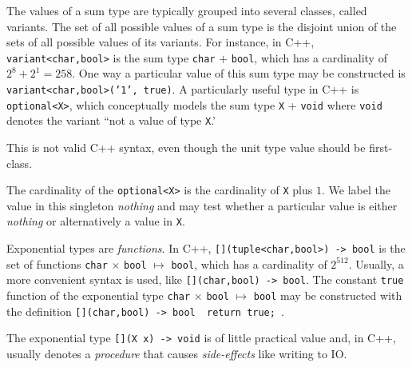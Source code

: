 \documentclass[ ../main.tex]{subfiles}
\begin{document}
The values of a sum type are typically grouped into several classes, called variants.
The set of all possible values of a sum type is the disjoint union of the sets of all possible values of its variants.
For instance, in C++, \texttt{variant<char,bool>}
is the sum type \texttt{char} $+$ \texttt{bool}, which has a cardinality of $2^8 + 2^1 = 258$.
One way a particular value of this sum type may be constructed is \texttt{variant<char,bool>('1', true)}.
A particularly useful type in C++ is \texttt{optional<X>}, which conceptually models the sum type \texttt{X} + \texttt{void} where \texttt{void} denotes the variant ``not a value of type \texttt{X}.'
\begin{remark}
This is not valid C++ syntax, even though the unit type value should be first-class.
\end{remark}
The cardinality of the \texttt{optional<X>} is the cardinality of \texttt{X} plus $1$.
We label the value in this singleton \emph{nothing} and may test whether a particular value is either \emph{nothing} or alternatively a value in \texttt{X}.

Exponential types are \emph{functions}.
In C++, \texttt{[](tuple<char,bool>) -> bool} is the set of functions \texttt{char} $\times$ \texttt{bool} $\mapsto$ \texttt{bool}, which has a cardinality of $2^{512}$.
Usually, a more convenient syntax is used, like \texttt{[](char,bool) -> bool}.
The constant \texttt{true} function of the exponential type \texttt{char} $\times$ \texttt{bool} $\mapsto$ \texttt{bool} may be constructed with the definition \texttt{[](char,bool) -> bool { return true; }}.
\begin{remark}
The exponential type \texttt{[](X x) -> void} is of little practical value and, in C++, usually denotes a \emph{procedure} that causes \emph{side-effects} like writing to IO.
\end{remark}
\end{document}
